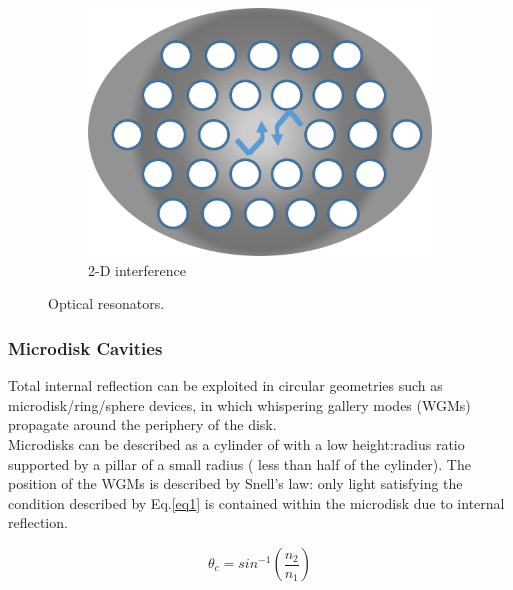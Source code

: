 \begin{figure}
\begin{subfigure}[b]{0.3\textwidth}
	\end{subfigure}%
	\hspace*{0.5cm}
	\begin{subfigure}[b]{0.3\textwidth}
		\centering
		\includegraphics[width=.85\linewidth]{Figs/Ch1/pcc}
		\caption{2-D interference}
	\end{subfigure}%
	
	\caption{Optical resonators.}
	\label{1.13}
\end{figure}

\FloatBarrier

\subsubsection{Microdisk Cavities}

Total internal reflection can be exploited in circular geometries such as microdisk/ring/sphere devices, in which whispering gallery modes  (WGMs) propagate around the periphery of the disk.\\
Microdisks can be described as a cylinder of with a low height:radius ratio supported by a pillar of a small radius ( less than half of the cylinder). The position of the WGMs is described by Snell's law: only light satisfying the condition described by Eq.\ref{eq1} is contained within the microdisk due to internal reflection.

\begin{equation} \label{eq1}
\theta_{c}=sin^{-1}(\frac{n_{2}}{n_{1}})
\end{equation}

